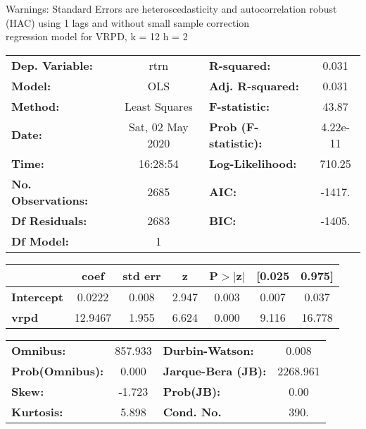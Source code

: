 Warnings: \newline
 [1] Standard Errors are heteroscedasticity and autocorrelation robust (HAC) using 1 lags and without small sample correction\\ 

regression model for VRPD, k = 12 h = 2\begin{center}
\begin{tabular}{lclc}
\toprule
\textbf{Dep. Variable:}    &       rtrn       & \textbf{  R-squared:         } &     0.031   \\
\textbf{Model:}            &       OLS        & \textbf{  Adj. R-squared:    } &     0.031   \\
\textbf{Method:}           &  Least Squares   & \textbf{  F-statistic:       } &     43.87   \\
\textbf{Date:}             & Sat, 02 May 2020 & \textbf{  Prob (F-statistic):} &  4.22e-11   \\
\textbf{Time:}             &     16:28:54     & \textbf{  Log-Likelihood:    } &    710.25   \\
\textbf{No. Observations:} &        2685      & \textbf{  AIC:               } &    -1417.   \\
\textbf{Df Residuals:}     &        2683      & \textbf{  BIC:               } &    -1405.   \\
\textbf{Df Model:}         &           1      & \textbf{                     } &             \\
\bottomrule
\end{tabular}
\begin{tabular}{lcccccc}
                   & \textbf{coef} & \textbf{std err} & \textbf{z} & \textbf{P$> |$z$|$} & \textbf{[0.025} & \textbf{0.975]}  \\
\midrule
\textbf{Intercept} &       0.0222  &        0.008     &     2.947  &         0.003        &        0.007    &        0.037     \\
\textbf{vrpd}      &      12.9467  &        1.955     &     6.624  &         0.000        &        9.116    &       16.778     \\
\bottomrule
\end{tabular}
\begin{tabular}{lclc}
\textbf{Omnibus:}       & 857.933 & \textbf{  Durbin-Watson:     } &    0.008  \\
\textbf{Prob(Omnibus):} &   0.000 & \textbf{  Jarque-Bera (JB):  } & 2268.961  \\
\textbf{Skew:}          &  -1.723 & \textbf{  Prob(JB):          } &     0.00  \\
\textbf{Kurtosis:}      &   5.898 & \textbf{  Cond. No.          } &     390.  \\
\bottomrule
\end{tabular}
\end{center}

